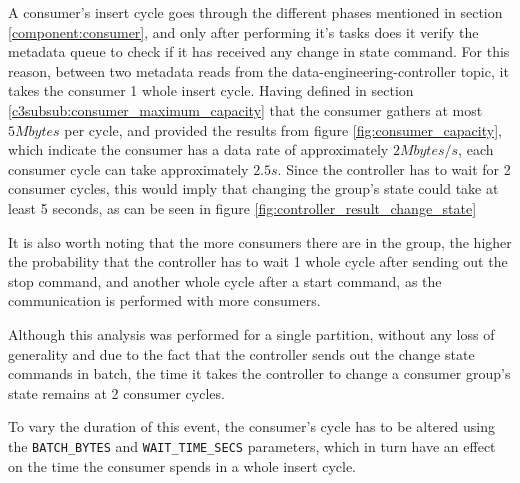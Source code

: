 A consumer's insert cycle goes through the different phases mentioned in section
\ref{component:consumer}, and only after performing it's tasks does it verify
the metadata queue to check if it has received any change in state command. For
this reason, between two metadata reads from the data-engineering-controller
topic, it takes the consumer 1 whole insert cycle. Having defined in section
\ref{c3subsub:consumer_maximum_capacity} that the consumer gathers at most
$5Mbytes$ per cycle, and provided the results from figure
\ref{fig:consumer_capacity}, which indicate the consumer has a data rate of
approximately $2Mbytes/s$, each consumer cycle can take approximately $2.5s$.
Since the controller has to wait for 2 consumer cycles, this would imply that
changing the group's state could take at least 5 seconds, as can be seen in figure
\ref{fig:controller_result_change_state}

It is also worth noting that the more consumers there are in the group, the
higher the probability that the controller has to wait 1 whole cycle after
sending out the stop command, and another whole cycle after a start command, as
the communication is performed with more consumers.

Although this analysis was performed for a single partition, without any loss of
generality and due to the fact that the controller sends out the change state
commands in batch, the time it takes the controller to change a consumer group's
state remains at 2 consumer cycles.

To vary the duration of this event, the consumer's cycle has to be altered using
the \lstinline{BATCH_BYTES} and \lstinline{WAIT_TIME_SECS} parameters, which in
turn have an effect on the time the consumer spends in a whole insert cycle.
